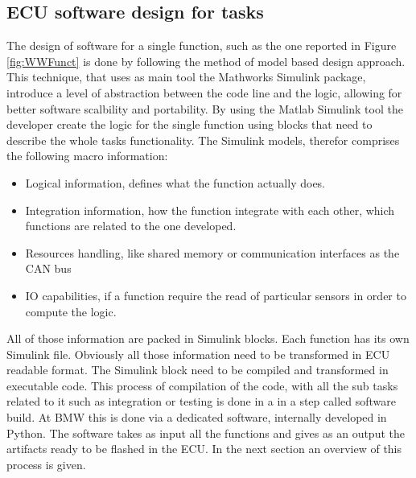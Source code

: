 \documentclass[../main.tex]{subfiles}
\begin{document}
\subsection{\gls{ECU} software design for tasks}
The design of software for a single function, such as the one reported in Figure   \ref{fig:WWFunct} is done by following the method of model based design approach. This technique, that uses as main tool the Mathworks Simulink package, introduce a level of abstraction between the code line and the logic, allowing for better software scalbility and portability. By using the Matlab Simulink tool the developer create the logic for the single function using blocks that need to describe the whole tasks functionality. The Simulink models, therefor comprises the following macro information:
\begin{itemize}
    \item Logical information, defines what the function actually does. 
    \item Integration information, how the function integrate with each other, which functions are related to the one developed. 
    \item Resources handling, like shared memory or communication interfaces as  the CAN bus
    \item IO capabilities, if a function require the read of particular sensors in order to compute the logic. 
\end{itemize}
All of those information are packed in Simulink blocks. Each function has its own Simulink file. Obviously all those information need to be transformed in \gls{ECU} readable format. The Simulink block need to be compiled and transformed in executable code. This process of compilation of the code, with all the sub tasks related to it such as integration or testing is done in a in a step called software build. 
At \gls{BMW} this is done via a dedicated software, internally developed in Python. The software takes as input all the functions and gives as an output the artifacts ready to be flashed in the \gls{ECU}. In the next section an overview of this process is given.
\end{document}
